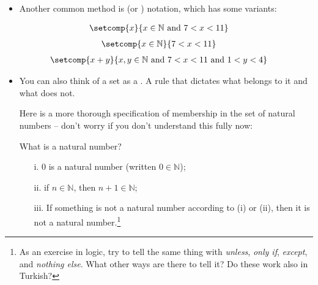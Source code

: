 \documentclass[11pt]{article}
\begin{document}
\begin{itemize}
\item Another common method is  (or ) notation, which has
some variants:
\end{itemize}


\begin{align}
\setcomp{x}{x \in \mathbb{N} \text{ and }7 < x < 11}
\end{align}
\begin{align}
\setcomp{x \in \mathbb{N}}{7 < x < 11}
\end{align}
\begin{align}
\setcomp{x + y}{x, y \in \mathbb{N}\text{ and }7 < x < 11\text{ and }1 < y < 4}
\end{align}


\begin{itemize}

\item You can also think of a set as a . A rule that dictates what
belongs to it and what does not.

\item[] Here is a more thorough specification of membership in the set of natural
numbers -- don't worry if you don't
understand this fully now:


\hrulefill
\begin{udefinition}{What is a natural number?}
\begin{itemize}
\item[i.] 0 is a natural number (written $0\in\mathbb{N}$);
\item[ii.] if $n\in\mathbb{N}$, then  $n+1\in\mathbb{N}$; 
\item[iii.] If something is not a natural number according to (i) or (ii), then
it is not a natural number.\footnote{As an exercise in logic, try to tell the
same thing with \emph{unless}, \emph{only if}, \emph{except}, and \emph{nothing
else}.  What other ways are there to tell it?  Do these work also in Turkish?}
\end{itemize}
\end{udefinition}
\hrulefill

\end{itemize}

\end{document}
